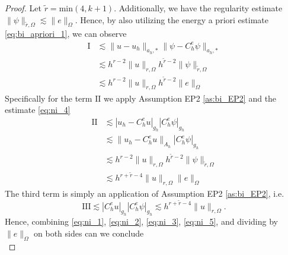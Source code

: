 \documentclass[11pt]{article}
\theoremstyle{remark}
\newcommand{\abs}[1]{\left\lvert #1 \right\rvert}
\numberwithin{equation}{section}
\begin{document}
\begin{proof}
        Let $\widetilde{r} = \mathrm{min} ( 4, k+1)  $. Additionally, we have the regularity estimate $\| \psi \|_{\widetilde{r},\Omega   }^{  } \lesssim \| e \|_{ \Omega   }^{  } $.
        Hence, by also  utilizing the energy a priori estimate \eqref{eq:bi_apriori_1}, we can observe
        \begin{equation}
            \label{eq:ni_2}
            \begin{split}
             \mathrm{I}    & \lesssim     \|u-u_{h}  \|_{a_{h},*  }^{  }    \| \psi  - C^{e}_{h}\psi \|_{a_{h},*  }^{  } \\
                & \lesssim     h^{r-2} \| u \|_{ r,\Omega   }^{  } h^{\widetilde{r}-2}   \| \psi   \|_{\widetilde{r},\Omega  }^{  } \\
                & \lesssim     h^{r-2} \| u \|_{ r,\Omega   }^{  }  h^{\widetilde{r}-2}  \| e   \|_{\Omega }^{  }
            \end{split}
        \end{equation}
        Specifically for the term $\mathrm{II} $ we apply Assumption EP2 \eqref{as:bi_EP2} and the estimate \eqref{eq:ni_4}
        \begin{equation}
            \label{eq:ni_3}
            \begin{split}
                \mathrm{II}  & \lesssim \abs{ u_{h} - C_{h}^{e}u } _{g_{h}} \abs{ C^{e}_{h} \psi }_{g_{h}}  \\
                & \lesssim  \| u_{h} - C_{h}^{e}u  \|_{A_{h}} \abs{ C^{e}_{h} \psi }_{g_{h}} \\
                             & \lesssim h^{r-2}  \| u  \|_{r,\Omega } h^{\widetilde{r}-2} \| \psi  \|_{\widetilde{r}, \Omega   }^{  } \\
                             & \lesssim h^{r + \widetilde{r} -4}   \| u  \|_{r,\Omega } \| e \|_{ \Omega   }^{  }
            \end{split}
        \end{equation}
        The third term is simply an application of Assumption EP2 \eqref{as:bi_EP2}, i.e.
        \begin{equation}
            \label{eq:ni_5}
             \mathrm{III}  \lesssim  \abs{ C^{e}_{h}u }_{g_{h}}  \abs{ C^{e}_{h}\psi }_{g_{h}} \lesssim h^{r + \widetilde{r}-4} \| u \|_{ r,\Omega  }^{  }.
        \end{equation}
        Hence, combining \eqref{eq:ni_1}, \eqref{eq:ni_2}, \eqref{eq:ni_3}, \eqref{eq:ni_5}, and dividing by $\| e \|_{ \Omega  }^{  } $ on both sides can we conclude
        \begin{equation}

\end{equation}
\end{proof}
\end{document}
